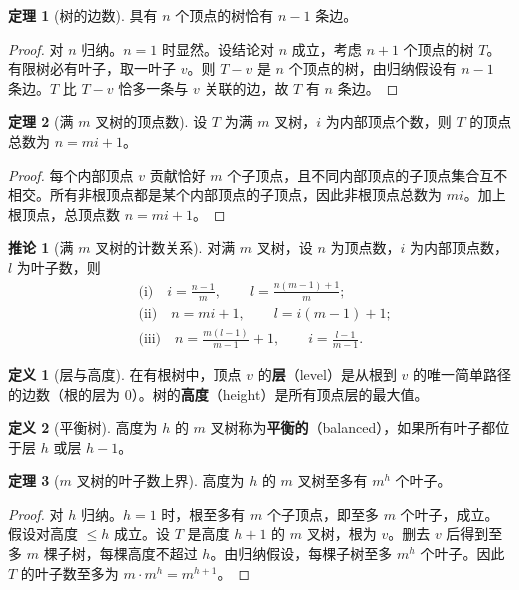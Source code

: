 \documentclass[UTF8,11pt,a4paper]{ctexbook}   %
\theoremstyle{definition}
\newtheorem{definition}{定义}[section]
\newtheorem{theorem}{定理}[section]
\newtheorem{corollary}{推论}[section]
\begin{document}
\begin{theorem}[树的边数]
具有 $n$ 个顶点的树恰有 $n-1$ 条边。
\end{theorem}

\begin{proof}
对 $n$ 归纳。$n=1$ 时显然。设结论对 $n$ 成立，考虑 $n+1$ 个顶点的树 $T$。有限树必有叶子，取一叶子 $v$。则 $T-v$ 是 $n$ 个顶点的树，由归纳假设有 $n-1$ 条边。$T$ 比 $T-v$ 恰多一条与 $v$ 关联的边，故 $T$ 有 $n$ 条边。
\end{proof}

\begin{theorem}[满 $m$ 叉树的顶点数]
设 $T$ 为满 $m$ 叉树，$i$ 为内部顶点个数，则 $T$ 的顶点总数为 $n=mi+1$。
\end{theorem}

\begin{proof}
每个内部顶点 $v$ 贡献恰好 $m$ 个子顶点，且不同内部顶点的子顶点集合互不相交。所有非根顶点都是某个内部顶点的子顶点，因此非根顶点总数为 $mi$。加上根顶点，总顶点数 $n=mi+1$。
\end{proof}

\begin{corollary}[满 $m$ 叉树的计数关系]
对满 $m$ 叉树，设 $n$ 为顶点数，$i$ 为内部顶点数，$l$ 为叶子数，则
\begin{align*}
    &\text{(i)}\quad i=\frac{n-1}{m},\qquad l=\frac{n(m-1)+1}{m};\\[0.3em]
    &\text{(ii)}\quad n=mi+1,\qquad l=i(m-1)+1;\\[0.3em]
    &\text{(iii)}\quad n=\frac{m(l-1)}{m-1}+1,\qquad i=\frac{l-1}{m-1}.
\end{align*}
\end{corollary}

\begin{definition}[层与高度]
在有根树中，顶点 $v$ 的\textbf{层}（level）是从根到 $v$ 的唯一简单路径的边数（根的层为 0）。树的\textbf{高度}（height）是所有顶点层的最大值。
\end{definition}

\begin{definition}[平衡树]
高度为 $h$ 的 $m$ 叉树称为\textbf{平衡的}（balanced），如果所有叶子都位于层 $h$ 或层 $h-1$。
\end{definition}

\begin{theorem}[$m$ 叉树的叶子数上界]
高度为 $h$ 的 $m$ 叉树至多有 $m^h$ 个叶子。
\end{theorem}

\begin{proof}
对 $h$ 归纳。$h=1$ 时，根至多有 $m$ 个子顶点，即至多 $m$ 个叶子，成立。假设对高度 $\le h$ 成立。设 $T$ 是高度 $h+1$ 的 $m$ 叉树，根为 $v$。删去 $v$ 后得到至多 $m$ 棵子树，每棵高度不超过 $h$。由归纳假设，每棵子树至多 $m^h$ 个叶子。因此 $T$ 的叶子数至多为 $m\cdot m^h=m^{h+1}$。
\end{proof}
\end{document}
